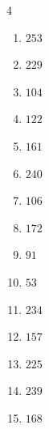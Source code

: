 \begin{multicols}{4}
\begin{enumerate}
  \item $253$


  \item $229$


  \item $104$


  \item $122$


  \item $161$


  \item $240$


\columnbreak %

\resetques

  \item $106$


  \item $172$


  \item $91$


  \item $53$


  \item $234$


  \item $157$


  \item $225$


  \item $239$


  \item $168$



\end{enumerate}
\end{multicols}
